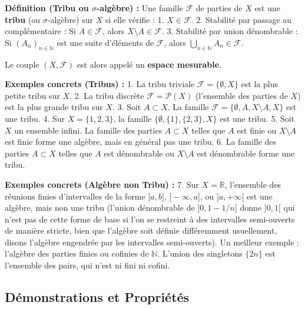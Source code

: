 \documentclass[11pt,a4paper]{article}
\begin{document}
\textbf{Définition (Tribu ou $\sigma$-algèbre) :}
Une famille $\mathcal{F}$ de parties de $X$ est une \textbf{tribu} (ou $\sigma$-algèbre) sur $X$ si elle vérifie :
1. $X \in \mathcal{F}$.
2. Stabilité par passage au complémentaire : Si $A \in \mathcal{F}$, alors $X \setminus A \in \mathcal{F}$.
3. Stabilité par union dénombrable : Si $(A_n)_{n \in \mathbb{N}}$ est une suite d'éléments de $\mathcal{F}$, alors $\bigcup_{n \in \mathbb{N}} A_n \in \mathcal{F}$.

Le couple $(X, \mathcal{F})$ est alors appelé un \textbf{espace mesurable}.

\textbf{Exemples concrets (Tribus) :}
1. La tribu triviale $\mathcal{F} = \{\emptyset, X\}$ est la plus petite tribu sur $X$.
2. La tribu discrète $\mathcal{F} = \mathcal{P}(X)$ (l'ensemble des parties de $X$) est la plus grande tribu sur $X$.
3. Soit $A \subset X$. La famille $\mathcal{F} = \{\emptyset, A, X \setminus A, X\}$ est une tribu.
4. Sur $X = \{1, 2, 3\}$, la famille $\{\emptyset, \{1\}, \{2, 3\}, X\}$ est une tribu.
5. Soit $X$ un ensemble infini. La famille des parties $A \subset X$ telles que $A$ est finie ou $X \setminus A$ est finie forme une algèbre, mais en général pas une tribu.
6. La famille des parties $A \subset X$ telles que $A$ est dénombrable ou $X \setminus A$ est dénombrable forme une tribu.

\textbf{Exemples concrets (Algèbre non Tribu) :}
7. Sur $X = \mathbb{R}$, l'ensemble des réunions finies d'intervalles de la forme $]a, b]$, $]-\infty, a]$, ou $]a, +\infty[$ est une algèbre, mais non une tribu (l'union dénombrable de $]0, 1-1/n]$ donne $]0, 1[$ qui n'est pas de cette forme de base si l'on se restreint à des intervalles semi-ouverts de manière stricte, bien que l'algèbre soit définie différemment usuellement, disons l'algèbre engendrée par les intervalles semi-ouverts). Un meilleur exemple : l'algèbre des parties finies ou cofinies de $\mathbb{N}$. L'union des singletons $\{2n\}$ est l'ensemble des pairs, qui n'est ni fini ni cofini.


\subsection{Démonstrations et Propriétés}
\end{document}
